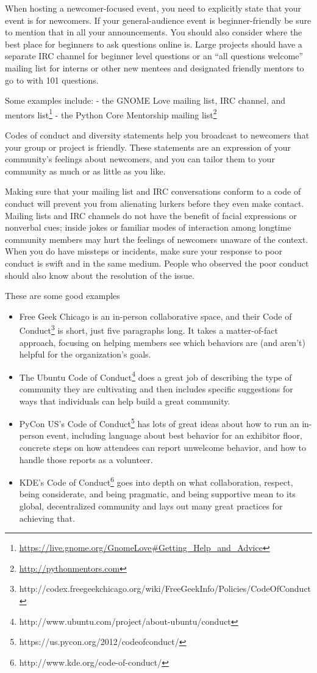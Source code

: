 When hosting a newcomer-focused event, you need to explicitly state that your event is for newcomers. If your general-audience event is beginner-friendly be sure to mention that in all your announcements. You should also consider where the best place for beginners to ask questions online is. Large projects should have a separate IRC channel for beginner level questions or an “all questions welcome” mailing list for interns or other new mentees and designated friendly mentors to go to with 101 questions. 

Some examples include:
- the GNOME Love mailing list, IRC channel, and mentors list\footnote{\url{https://live.gnome.org/GnomeLove\#Getting_Help_and_Advice}}
- the Python Core Mentorship mailing list\footnote{\url{http://pythonmentors.com}}

Codes of conduct and diversity statements help you broadcast to newcomers that your group or project is friendly. These statements are an expression of your community’s feelings about newcomers, and you can tailor them to your community as much or as little as you like.

Making sure that your mailing list and IRC conversations conform to a code of conduct will prevent you from alienating lurkers before they even make contact. Mailing lists and IRC channels do not have the benefit of facial expressions or nonverbal cues; inside jokes or familiar modes of interaction among longtime community members may hurt the feelings of newcomers unaware of the context. When you do have missteps or incidents, make sure your response to poor conduct is swift and in the same medium. People who observed the poor conduct should also know about the resolution of the issue.

These are some good examples
\begin{itemize}
  \item Free Geek Chicago is an in-person collaborative space, and their Code of Conduct\footnote{http://codex.freegeekchicago.org/wiki/FreeGeekInfo/Policies/CodeOfConduct} is short, just five paragraphs long. It takes a matter-of-fact approach, focusing on helping members see which behaviors are (and aren’t) helpful for the organization’s goals.
  \item The Ubuntu Code of Conduct\footnote{http://www.ubuntu.com/project/about-ubuntu/conduct} does a great job of describing the type of community they are cultivating and then includes specific suggestions for ways that individuals can help build a great community.
  \item PyCon US's Code of Conduct\footnote{https://us.pycon.org/2012/codeofconduct/} has lots of great ideas about how to run an in-person event, including language about best behavior for an exhibitor floor, concrete steps on how attendees can report unwelcome behavior, and how to handle those reports as a volunteer.
  \item KDE’s Code of Conduct\footnote{http://www.kde.org/code-of-conduct/} goes into depth on what collaboration, respect, being considerate, and being pragmatic, and being supportive mean to its global, decentralized community and lays out many great practices for achieving that.
\end{itemize}

